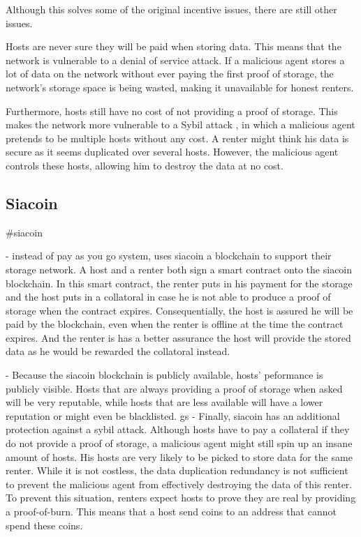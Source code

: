 Although this solves some of the original incentive issues, there are still other issues. 

Hosts are never sure they will be paid when storing data. This means that the network is vulnerable to a denial of service attack. If a malicious agent stores a lot of data on the network without ever paying the first proof of storage, the network's storage space is being wasted, making it unavailable for honest renters.

Furthermore, hosts still have no cost of not providing a proof of storage. This makes the network more vulnerable to a Sybil attack \cite{sybil-attack}, in which a malicious agent pretends to be multiple hosts without any cost. A renter might think his data is secure as it seems duplicated over several hosts. However, the malicious agent controls these hosts, allowing him to destroy the data at no cost.

\subsection{Siacoin}

\iffalse
#siacoin

- instead of pay as you go system, uses siacoin a blockchain to support their storage network. A host and a renter both sign a smart contract onto the siacoin blockchain. In this smart contract, the renter puts in his payment for the storage and the host puts in a collatoral in case he is not able to produce a proof of storage when the contract expires. Consequentially, the host is assured he will be paid by the blockchain, even when the renter is offline at the time the contract expires. And the renter is has a better assurance the host will provide the stored data as he would be rewarded the collatoral instead.

- Because the siacoin blockchain is publicly available, hosts' peformance is publicly visible. Hosts that are always providing a proof of storage when asked will be very reputable, while hosts that are less available will have a lower reputation or might even be blacklisted.
gs
- Finally, siacoin has an additional protection against a sybil attack. Although hosts have to pay a collateral if they do not provide a proof of storage, a malicious agent might still spin up an insane amount of hosts. His hosts are very likely to be picked to store data for the same renter. While it is not costless, the data duplication redundancy is not sufficient to prevent the malicious agent from effectively destroying the data of this renter. To prevent this situation, renters expect hosts to prove they are real by providing a proof-of-burn. This means that a host send coins to an address that cannot spend these coins.


